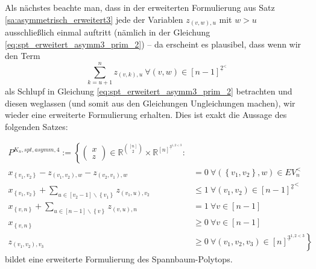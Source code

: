 \documentclass[10p,a4paper,BCOR = 12mm, DIV=15]{scrbook}
\begin{document}
Als nächstes beachte man, dass in der erweiterten Formulierung aus Satz \ref{sa:asymmetrisch_erweitert3} jede der Variablen $z_{\left(v, w\right), u}$ mit $w>u$ ausschließlich einmal auftritt (nämlich in der Gleichung \eqref{eq:spt_erweitert_asymm3_prim_2}) -- da erscheint es plausibel, dass wenn wir den Term
\begin{displaymath}
\sum_{k=u+1}^n z_{\left(v, k\right), u} \ \forall \left(v, w\right)\in \left[n-1\right]^{\underline{2}^<}
\end{displaymath}
als Schlupf in Gleichung \eqref{eq:spt_erweitert_asymm3_prim_2} betrachten und diesen weglassen (und somit aus den Gleichungen Ungleichungen machen), wir wieder eine erweiterte Formulierung erhalten. Dies ist exakt die Aussage des folgenden Satzes:

\begin{Sa}
\label{sa:asymmetrisch_erweitert4}
\begin{align}
P^{K_n, spt, asymm, 4} := \left\{
\left(\begin{array}{c}
x \\
z
\end{array}\right)\in \mathbb{R}^{[n]\choose 2} \times \mathbb{R}^{\left[n\right]^{\underline{3}^{1, 2<3}}}: \nonumber\right. \\
x_{\left\{v_1, v_2\right\}} - z_{\left(v_1, v_2\right), w} - z_{\left(v_2, v_1\right), w} & = 0\ \forall \left(\left\{v_1, v_2\right\}, w\right)\in EV_n^< \label{eq:spt_erweitert_asymm4_prim_1} \\
x_{\left\{v_1, v_2\right\}} + \sum_{u\in[v_2-1]\backslash\left\{v_1\right\}} z_{\left(v_1, u\right), v_2} & \leq 1\ \forall \left(v_1, v_2\right)\in {[n-1]^{\underline{2}}}^<  \label{eq:spt_erweitert_asymm4_prim_2} \\
x_{\left\{v, n\right\}} + \sum_{u\in[n-1]\backslash\left\{v\right\}} z_{\left(v, u\right), n} & = 1\ \forall v \in [n-1] \label{eq:spt_erweitert_asymm4_prim_2,5} \\
x_{\left\{v, n\right\}} & \geq 0 \ \forall v\in \left[n-1\right] \label{eq:spt_erweitert_asymm4_x_n} \\
z_{\left(v_1, v_2\right), v_3} & \left. \geq 0 \ \forall \left(v_1, v_2, v_3\right)\in \left[n\right]^{\underline{3}^{1, 2<3}} \right\} \label{eq:spt_erweitert_asymm4_z}
\end{align}
bildet eine erweiterte Formulierung des Spannbaum-Polytops.
\end{Sa}
\end{document}
